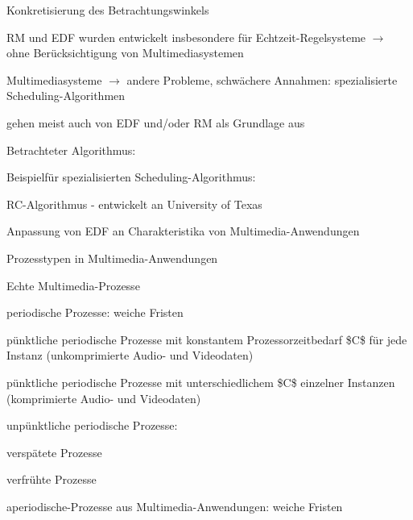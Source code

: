 \documentclass[a4paper]{article}
\begin{document}
\begin{multicols}{3}
    \begin{itemize*}
        \item
        Konkretisierung des Betrachtungswinkels
        \begin{itemize*}
            \item RM und EDF wurden entwickelt insbesondere für Echtzeit-Regelsysteme $\rightarrow$  ohne Berücksichtigung von Multimediasystemen
            \item Multimediasysteme $\rightarrow$  andere Probleme, schwächere Annahmen: spezialisierte Scheduling-Algorithmen
            \item gehen meist auch von EDF und/oder RM als Grundlage aus
        \end{itemize*}
        \item
        Betrachteter Algorithmus:
        \begin{itemize*}
            \item Beispielfür spezialisierten Scheduling-Algorithmus: \begin{itemize*} \item   RC-Algorithmus - entwickelt an University of Texas \item   Anpassung von EDF an Charakteristika von Multimedia-Anwendungen \end{itemize*}
        \end{itemize*}
    \end{itemize*}

    Prozesstypen in Multimedia-Anwendungen

    \begin{enumerate*}
        \item
        Echte Multimedia-Prozesse
    \end{enumerate*}

    \begin{itemize*}
        \item
        periodische Prozesse: weiche Fristen
        \begin{enumerate*}

            \item pünktliche periodische Prozesse mit konstantem Prozessorzeitbedarf \$C\$ für jede Instanz (unkomprimierte Audio- und Videodaten)
            \item pünktliche periodische Prozesse mit unterschiedlichem \$C\$ einzelner Instanzen (komprimierte Audio- und Videodaten)
            \item unpünktliche periodische Prozesse: \begin{itemize*} \item   verspätete Prozesse \item   verfrühte Prozesse \end{itemize*}
        \end{enumerate*}
        \item
        aperiodische-Prozesse aus Multimedia-Anwendungen: weiche Fristen
    \end{itemize*}


\end{multicols}
\end{document}

